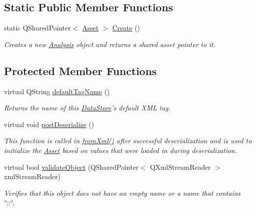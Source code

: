 \subsection*{Static Public Member Functions}
\begin{DoxyCompactItemize}
\item 
\hypertarget{class_picto_1_1_analysis_ab8fc09c9f662131ebbcbdc8883794711}{static Q\-Shared\-Pointer$<$ \hyperlink{class_picto_1_1_asset}{Asset} $>$ \hyperlink{class_picto_1_1_analysis_ab8fc09c9f662131ebbcbdc8883794711}{Create} ()}\label{class_picto_1_1_analysis_ab8fc09c9f662131ebbcbdc8883794711}

\begin{DoxyCompactList}\small\item\em Creates a new \hyperlink{class_picto_1_1_analysis}{Analysis} object and returns a shared asset pointer to it. \end{DoxyCompactList}\end{DoxyCompactItemize}
\subsection*{Protected Member Functions}
\begin{DoxyCompactItemize}
\item 
virtual Q\-String \hyperlink{class_picto_1_1_analysis_a096a25845ebfe85bd6dde170ef17cb32}{default\-Tag\-Name} ()
\begin{DoxyCompactList}\small\item\em Returns the name of this \hyperlink{class_picto_1_1_data_store}{Data\-Store}'s default X\-M\-L tag. \end{DoxyCompactList}\item 
virtual void \hyperlink{class_picto_1_1_analysis_a1495e960c7416afd2f443ae796ed0311}{post\-Deserialize} ()
\begin{DoxyCompactList}\small\item\em This function is called in \hyperlink{class_picto_1_1_asset_a8bed4da09ecb1c07ce0dab313a9aba67}{from\-Xml()} after successful deserialization and is used to initialize the \hyperlink{class_picto_1_1_asset}{Asset} based on values that were loaded in during deserialization. \end{DoxyCompactList}\item 
\hypertarget{class_picto_1_1_analysis_aef182947f1ef6c4020b1f39bade19d3a}{virtual bool \hyperlink{class_picto_1_1_analysis_aef182947f1ef6c4020b1f39bade19d3a}{validate\-Object} (Q\-Shared\-Pointer$<$ Q\-Xml\-Stream\-Reader $>$ xml\-Stream\-Reader)}\label{class_picto_1_1_analysis_aef182947f1ef6c4020b1f39bade19d3a}

\begin{DoxyCompactList}\small\item\em Verifies that this object does not have an empty name or a name that contains \char`\"{}\-::\char`\"{}. \end{DoxyCompactList}\end{DoxyCompactItemize}
